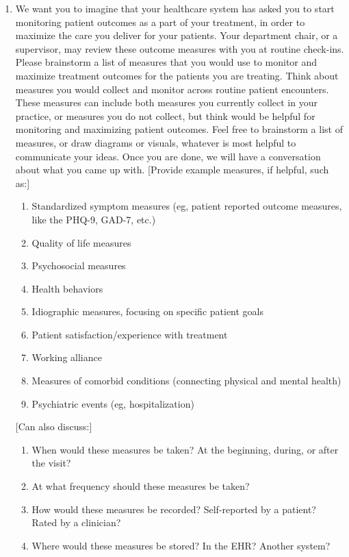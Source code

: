 \begin{enumerate}
    \item We want you to imagine that your healthcare system has asked you to start monitoring patient outcomes as a part of your treatment, in order to maximize the care you deliver for your patients. 
    Your department chair, or a supervisor, may review these outcome measures with you at routine check-ins. 
    Please brainstorm a list of measures that you would use to monitor and maximize treatment outcomes for the patients you are treating. 
    Think about measures you would collect and monitor across routine patient encounters. 
    These measures can include both measures you currently collect in your practice, or measures you do not collect, but think would be helpful for monitoring and maximizing patient outcomes. 
    Feel free to brainstorm a list of measures, or draw diagrams or visuals, whatever is most helpful to communicate your ideas. 
    Once you are done, we will have a conversation about what you came up with.
    [Provide example measures, if helpful, such as:]
    \begin{enumerate}
        \item Standardized symptom measures (eg, patient reported outcome measures, like the PHQ-9, GAD-7, etc.)
        \item Quality of life measures
        \item Psychosocial measures
        \item Health behaviors
        \item Idiographic measures, focusing on specific patient goals
        \item Patient satisfaction/experience with treatment
        \item Working alliance
        \item Measures of comorbid conditions (connecting physical and mental health)
        \item Psychiatric events (eg, hospitalization)
    \end{enumerate}
    [Can also discuss:]
    \begin{enumerate}
        \item When would these measures be taken? At the beginning, during, or after the visit?
        \item At what frequency should these measures be taken?
        \item How would these measures be recorded? Self-reported by a patient? Rated by a clinician?
        \item Where would these measures be stored? In the EHR? Another system?
    \end{enumerate}


\end{enumerate}
